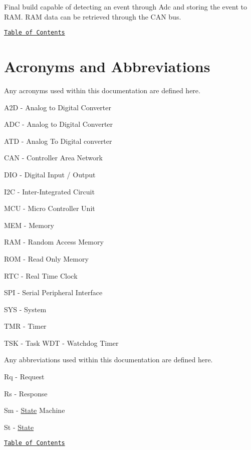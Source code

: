 Final build capable of detecting an event through Adc and storing the event to R\-A\-M. R\-A\-M data can be retrieved through the C\-A\-N bus.

\par
\href{#Contents}{\tt Table of Contents}\par
 



\label{_Acronyms}%
\hypertarget{index_Acronyms}{}\section{Acronyms and Abbreviations}\label{index_Acronyms}
Any acronyms used within this documentation are defined here.\par


A2\-D -\/ Analog to Digital Converter \par
 A\-D\-C -\/ Analog to Digital Converter \par
 A\-T\-D -\/ Analog To Digital converter \par
 C\-A\-N -\/ Controller Area Network \par
 D\-I\-O -\/ Digital Input / Output \par
 I2\-C -\/ Inter-\/\-Integrated Circuit \par
 M\-C\-U -\/ Micro Controller Unit \par
 M\-E\-M -\/ Memory \par
 R\-A\-M -\/ Random Access Memory \par
 R\-O\-M -\/ Read Only Memory \par
 R\-T\-C -\/ Real Time Clock \par
 S\-P\-I -\/ Serial Peripheral Interface \par
 S\-Y\-S -\/ System \par
 T\-M\-R -\/ Timer \par
 T\-S\-K -\/ Task W\-D\-T -\/ Watchdog Timer \par
\par


Any abbreviations used within this documentation are defined here. \par


Rq -\/ Request \par
 Rs -\/ Response \par
 Sm -\/ \hyperlink{classState}{State} Machine \par
 St -\/ \hyperlink{classState}{State} \par


\par
\href{#Contents}{\tt Table of Contents}\par
 



